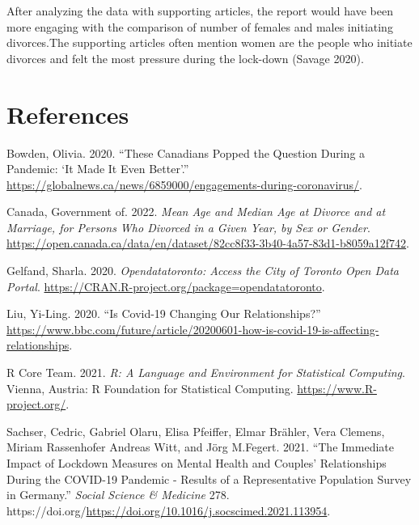 \documentclass[
]{article}
\newlength{\cslhangindent}
\newlength{\cslentryspacingunit} %
\newenvironment{CSLReferences}[2] %
 {%
  \setlength{\parindent}{0pt}
  \ifodd #1
  \let\oldpar\par
  \def\par{\hangindent=\cslhangindent\oldpar}
  \fi
  \setlength{\parskip}{#2\cslentryspacingunit}
 }%
 {}
\begin{document}
After analyzing the data with supporting articles, the report would have been more engaging with the comparison of number of females and males initiating divorces.The supporting articles often mention women are the people who initiate divorces and felt the most pressure during the lock-down (Savage 2020).

\newpage

\hypertarget{references}{%
\section*{References}\label{references}}

\hypertarget{refs}{}
\begin{CSLReferences}{1}{0}
\leavevmode{}%
Bowden, Olivia. 2020. {``These Canadians Popped the Question During a Pandemic: {`It Made It Even Better'}.''} \url{https://globalnews.ca/news/6859000/engagements-during-coronavirus/}.

\leavevmode{}%
Canada, Government of. 2022. \emph{Mean Age and Median Age at Divorce and at Marriage, for Persons Who Divorced in a Given Year, by Sex or Gender}. \url{https://open.canada.ca/data/en/dataset/82cc8f33-3b40-4a57-83d1-b8059a12f742}.

\leavevmode{}%
Gelfand, Sharla. 2020. \emph{Opendatatoronto: Access the City of Toronto Open Data Portal}. \url{https://CRAN.R-project.org/package=opendatatoronto}.

\leavevmode{}%
Liu, Yi-Ling. 2020. {``Is Covid-19 Changing Our Relationships?''} \url{https://www.bbc.com/future/article/20200601-how-is-covid-19-is-affecting-relationships}.

\leavevmode{}%
R Core Team. 2021. \emph{R: A Language and Environment for Statistical Computing}. Vienna, Austria: R Foundation for Statistical Computing. \url{https://www.R-project.org/}.

\leavevmode{}%
Sachser, Cedric, Gabriel Olaru, Elisa Pfeiffer, Elmar Brähler, Vera Clemens, Miriam Rassenhofer Andreas Witt, and Jörg M.Fegert. 2021. {``The Immediate Impact of Lockdown Measures on Mental Health and Couples' Relationships During the COVID-19 Pandemic - Results of a Representative Population Survey in Germany.''} \emph{Social Science \& Medicine} 278. https://doi.org/\url{https://doi.org/10.1016/j.socscimed.2021.113954}.


\end{CSLReferences}
\end{document}
